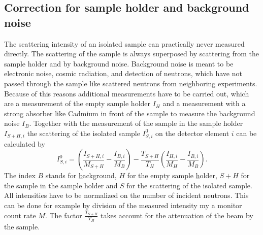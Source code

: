 \subsection{Correction for sample holder and background noise}
The scattering intensity of an isolated sample can practically never
measured directly. The scattering of the sample is always superposed
by scattering from the sample holder and by background noise. Background noise
is meant to be electronic noise, cosmic radiation, and detection of neutrons, which
have not passed through the sample like scattered neutrons from neighboring experiments.
Because of this reasons additional measurements have to be carried out, which are
a measurement of the empty sample holder $I_H$ and a measurement with a strong
absorber like Cadmium in front of the sample to measure the background noise $I_B$.
Together with the measurement of the sample in the sample holder $I_{S+H,i}$
 the scattering of the isolated sample $I^0_{S,i}$ on the detector element $i$ can
 be calculated by
\begin{equation}
I_{S,i}^0 = \left( \frac{I_{S+H,i}}{M_{S+H}} - \frac{I_{B,i}}{M_B} \right)
-
\frac{T_{S+H}}{T_H} \left(\frac{I_{H,i}}{M_{H}} - \frac{I_{B,i}}{M_B} \right) .
\label{dsdoexp}
\end{equation}
The index $B$ stands for \underline{b}ackground, $H$
for the empty sample \underline{h}older, $S+H$ for the sample in the sample holder and $S$
for the scattering of the isolated sample.
All intensities have to be normalized on the number of incident neutrons. This can be done
for example by division of the measured intensity my a monitor count rate $M$.
The factor $ \frac{T_{S+H}}{T_H}$ takes account for the attenuation of the beam by the sample.

